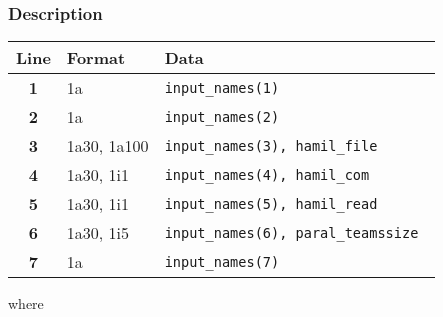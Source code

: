 \documentclass[a4paper,11pt]{article}
\begin{document}
\subsubsection*{Description}
\begin{center}
\begin{tabular}{|c|l|l|}
\hline
Line & Format & Data \\
\hline
 \textbf{1}   & 1a          & \tt input\_names(1)                   \\
 \textbf{2}   & 1a          & \tt input\_names(2)                   \\
 \textbf{3}   & 1a30, 1a100 & \tt input\_names(3), hamil\_file      \\
 \textbf{4}   & 1a30, 1i1   & \tt input\_names(4), hamil\_com       \\
 \textbf{5}   & 1a30, 1i1   & \tt input\_names(5), hamil\_read      \\
 \textbf{6}   & 1a30, 1i5   & \tt input\_names(6), paral\_teamssize \\
 \textbf{7}   & 1a          & \tt input\_names(7)                   \\
\hline
\end{tabular}
\end{center}
where 
\end{document}
